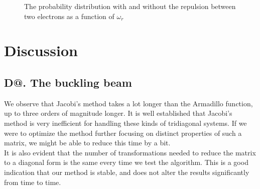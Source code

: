 \documentclass[%
reprint,
amsmath, 
amssymb, 
aps,]{revtex4-1}
\makeatletter
\newcommand*{\rom}[1]{\expandafter\@slowromancap\romannumeral #1@}
\makeatother
\begin{document}
\begin{figure}
\caption{The probability distribution with and without the repulsion between two electrons as a function of $\omega_r$} \label{wavefunc}
			\end{figure}

	\section*{Discussion} 
		\subsection*{D\rom{1}. The buckling beam}
We observe that Jacobi's method takes a lot longer than the Armadillo function, up to three orders of magnitude longer. It is well established that Jacobi's method is very inefficient for handling these kinds of tridiagonal systems. If we were to optimize the method further focusing on distinct properties of such a matrix, we might be able to reduce this time by a bit. \\ \indent 
It is also evident that the number of transformations needed to reduce the matrix to a diagonal form is the same every time we test the algorithm. This is a good indication that our method is stable, and does not alter the results significantly from time to time.  
\end{document}
